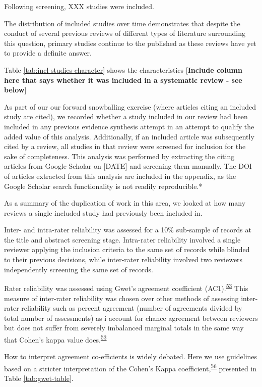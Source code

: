 \documentclass[a4paper, twoside]{templates/ociamthesis}
\begin{document}
Following screening, XXX studies were included.

The distribution of included studies over time demonstrates that despite the conduct of several previous reviews of different types of literature surrounding this question, primary studies continue to the published as these reviews have yet to provide a definite answer.

Table \ref{tab:incl-studies-character} shows the characteristics {[}\textbf{Include column here that says whether it was included in a systematic review - see below}{]}

As part of our our forward snowballing exercise (where articles citing an included study are cited), we recorded whether a study included in our review had been included in any previous evidence synthesis attempt in an attempt to qualify the added value of this analysis. Additionally, if an included article was subsequently cited by a review, all studies in that review were screened for inclusion for the sake of completeness. This analysis was performed by extracting the citing articles from Google Scholar on {[}DATE{]} and screening them manually. The DOI of articles extracted from this analysis are included in the appendix, as the Google Scholar search functionality is not readily reproducible.*

As a summary of the duplication of work in this area, we looked at how many reviews a single included study had previously been included in.

Inter- and intra-rater reliability was assessed for a 10\% sub-sample of records at the title and abstract screening stage. Intra-rater reliability involved a single reviewer applying the inclusion criteria to the same set of records while blinded to their previous decisions, while inter-rater reliability involved two reviewers independently screening the same set of records.

Rater reliability was assessed using Gwet's agreement coefficient (AC1).\textsuperscript{\protect\hyperlink{ref-gwet2008}{53}} This measure of inter-rater reliability was chosen over other methods of assessing inter-rater reliability such as percent agreement (number of agreements divided by total number of assessments) as i account for chance agreement between reviewers but does not suffer from severely imbalanced marginal totals in the same way that Cohen's kappa value does.\textsuperscript{\protect\hyperlink{ref-gwet2008}{53}}

How to interpret agreement co-efficients is widely debated. Here we use guidelines based on a stricter interpretation of the Cohen's Kappa coefficient,\textsuperscript{\protect\hyperlink{ref-mchugh2012}{56}} presented in Table \ref{tab:gwet-table}.
\end{document}
